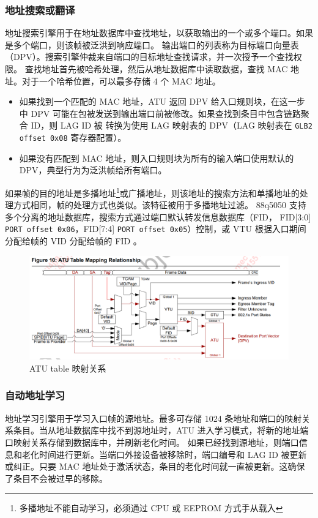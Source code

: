 \subsubsection{地址搜索或翻译}
地址搜索引擎用于在地址数据库中查找地址，以获取输出的一个或多个端口。如果是多个端口，则该帧被泛洪到响应端口。
输出端口的列表称为目标端口向量表（DPV）。搜索引擎仲裁来自端口的目标地址查找请求，并一次授予一个查找权限。
查找地址首先被哈希处理，然后从地址数据库中读取数据，查找 MAC 地址。对于一个哈希位置，可以最多存储 4 个 MAC 地址。

\begin{itemize}
    \item 如果找到一个匹配的 MAC 地址，ATU 返回 DPV 给入口规则块，在这一步中 DPV 可能在包被发送到输出端口前被修改。如果查找到条目中包含链路聚合 ID，则 LAG ID 被
转换为使用 LAG 映射表的 DPV（LAG 映射表在 \lstinline{GLB2 offset 0x08} 寄存器配置）。
    \item 如果没有匹配到 MAC 地址，则入口规则块为所有的输入端口使用默认的 DPV，典型行为为泛洪帧给所有端口。
\end{itemize}

如果帧的目的地址是多播地址\footnote{多播地址不能自动学习，必须通过 CPU 或 EEPROM 方式手从载入}或广播地址，则该地址的搜索方法和单播地址的处理方式相同，帧的处理方式也类似。该特征被用于多播地址过滤。
88q5050 支持多个分离的地址数据库，搜索方式通过端口默认转发信息数据库（FID， FID[3:0] \lstinline{PORT offset 0x06}，FID[7:4] \lstinline{PORT offset 0x05}）控制，或 VTU 根据入口期间分配给帧的 VID 分配给帧的 FID 。

\begin{figure}[ht]
    \centering
    \includegraphics[scale=0.7]{pic/Snipaste_2021-10-25_15-05-41.png}
    \caption{ATU table 映射关系}
    \label{fig:atu_table_mapping}
\end{figure}

\subsubsection{自动地址学习}
地址学习引擎用于学习入口帧的源地址。最多可存储 1024 条地址和端口的映射关系条目。当从地址数据库中找不到源地址时，ATU 进入学习模式，将新的地址端口映射关系存储到数据库中，并刷新老化时间。
如果已经找到源地址，则端口信息和老化时间进行更新。当端口外接设备被移除时，端口编号和 LAG ID 被更新或纠正。只要 MAC 地址处于激活状态，条目的老化时间就一直被更新。这确保了条目不会被过早的移除。


